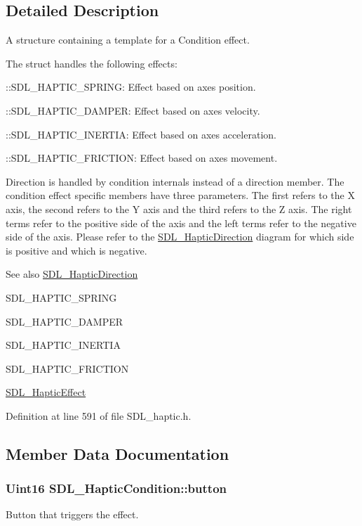 \subsection{Detailed Description}
A structure containing a template for a Condition effect. 

The struct handles the following effects\+:
\begin{DoxyItemize}
\item \+::\+S\+D\+L\+\_\+\+H\+A\+P\+T\+I\+C\+\_\+\+S\+P\+R\+I\+N\+G\+: Effect based on axes position.
\item \+::\+S\+D\+L\+\_\+\+H\+A\+P\+T\+I\+C\+\_\+\+D\+A\+M\+P\+E\+R\+: Effect based on axes velocity.
\item \+::\+S\+D\+L\+\_\+\+H\+A\+P\+T\+I\+C\+\_\+\+I\+N\+E\+R\+T\+I\+A\+: Effect based on axes acceleration.
\item \+::\+S\+D\+L\+\_\+\+H\+A\+P\+T\+I\+C\+\_\+\+F\+R\+I\+C\+T\+I\+O\+N\+: Effect based on axes movement.
\end{DoxyItemize}

Direction is handled by condition internals instead of a direction member. The condition effect specific members have three parameters. The first refers to the X axis, the second refers to the Y axis and the third refers to the Z axis. The right terms refer to the positive side of the axis and the left terms refer to the negative side of the axis. Please refer to the \hyperlink{structSDL__HapticDirection}{S\+D\+L\+\_\+\+Haptic\+Direction} diagram for which side is positive and which is negative.

\begin{DoxySeeAlso}{See also}
\hyperlink{structSDL__HapticDirection}{S\+D\+L\+\_\+\+Haptic\+Direction} 

S\+D\+L\+\_\+\+H\+A\+P\+T\+I\+C\+\_\+\+S\+P\+R\+I\+N\+G 

S\+D\+L\+\_\+\+H\+A\+P\+T\+I\+C\+\_\+\+D\+A\+M\+P\+E\+R 

S\+D\+L\+\_\+\+H\+A\+P\+T\+I\+C\+\_\+\+I\+N\+E\+R\+T\+I\+A 

S\+D\+L\+\_\+\+H\+A\+P\+T\+I\+C\+\_\+\+F\+R\+I\+C\+T\+I\+O\+N 

\hyperlink{unionSDL__HapticEffect}{S\+D\+L\+\_\+\+Haptic\+Effect} 
\end{DoxySeeAlso}


Definition at line 591 of file S\+D\+L\+\_\+haptic.\+h.



\subsection{Member Data Documentation}
\hypertarget{structSDL__HapticCondition_acd35a9d432ad122bf7824b16974eac7a}{
\subsubsection[{button}]{\setlength{\rightskip}{0pt plus 5cm}Uint16 S\+D\+L\+\_\+\+Haptic\+Condition\+::button}}\label{structSDL__HapticCondition_acd35a9d432ad122bf7824b16974eac7a}
Button that triggers the effect. 

